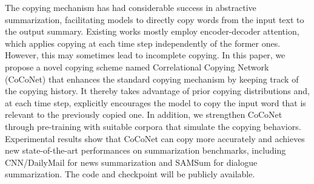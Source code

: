 The copying mechanism has had considerable success in abstractive summarization, facilitating models to directly copy words from the input text to the output summary. Existing works mostly employ encoder-decoder attention, which applies copying at each time step independently of the former ones. However, this may sometimes lead to incomplete copying. In this paper, we propose a novel copying scheme named Correlational Copying Network (CoCoNet) that enhances the standard copying mechanism by keeping track of the copying history. It thereby takes advantage of prior copying distributions and, at each time step, explicitly encourages the model to copy the input word that is relevant to the previously copied one. In addition, we strengthen CoCoNet through pre-training with suitable corpora that simulate the copying behaviors. Experimental results show that CoCoNet can copy more accurately and achieves new state-of-the-art performances on summarization benchmarks, including CNN/DailyMail for news summarization and SAMSum for dialogue summarization. The code and checkpoint will be publicly available.
